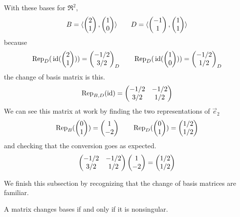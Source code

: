 \begin{example}
With these bases for \( \Re^2 \),
\begin{equation*}
  B=
  \sequence{
            \colvec{2 \\ 1},
            \colvec{1 \\ 0} }
  \qquad
  D=
  \sequence{
            \colvec{-1 \\ 1},
            \colvec{1 \\ 1} }
\end{equation*}
because
\begin{equation*}
  \rep{\,\identity(\colvec{2 \\ 1})}{D}
  =\colvec{-1/2 \\ 3/2}_D
  \qquad
  \rep{\,\identity(\colvec{1 \\ 0})}{D}
  =\colvec{-1/2 \\ 1/2}_D
\end{equation*}
the change of basis matrix is this.
\begin{equation*}
  \rep{\rm id}{B,D}
  =
    \begin{pmatrix}
       -1/2  &-1/2  \\
        3/2  &1/2
    \end{pmatrix}
\end{equation*}
We can see this matrix at work by finding the two representations of
$\vec{e}_2$ 
\begin{equation*}
  \rep{\colvec{0 \\ 1} }{B}
  =\colvec{1 \\ -2}
  \qquad
  \rep{\colvec{0 \\ 1} }{D}
  =\colvec{1/2 \\ 1/2}
\end{equation*}
and checking that the conversion goes as expected. 
\begin{equation*}
    \begin{pmatrix}
       -1/2  &-1/2  \\
        3/2  &1/2
    \end{pmatrix}
  \colvec{1 \\ -2}
  =
  \colvec{1/2 \\ 1/2}
\end{equation*}
\end{example}

We finish this subsection by recognizing that the change of basis matrices
are familiar.

\begin{lemma}    \label{le:NonSingIsChBasis}
A matrix changes bases if and only if it is nonsingular.
\end{lemma}

